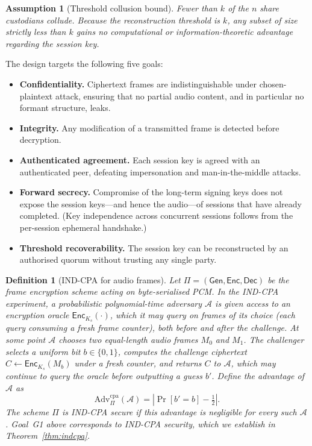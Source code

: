 \documentclass[pdflatex,sn-mathphys-num]{sn-jnl}%
\theoremstyle{thmstyleone}%
\newtheorem{assumption}{Assumption}%
\theoremstyle{thmstyletwo}%
\theoremstyle{thmstylethree}%
\newtheorem{definition}{Definition}%
\begin{document}
\begin{assumption}[Threshold collusion bound]
\label{as:escrow}
Fewer than $k$ of the $n$ share custodians collude. Because the reconstruction threshold is $k$, any subset of size strictly less than $k$ gains no computational or information-theoretic advantage regarding the session key.
\end{assumption}

The design targets the following five goals:

\begin{itemize}[leftmargin=2.2em]
\item[\textbf{G1}] \textbf{Confidentiality.} Ciphertext frames are indistinguishable under chosen-plaintext attack, ensuring that no partial audio content, and in particular no formant structure, leaks.
\item[\textbf{G2}] \textbf{Integrity.} Any modification of a transmitted frame is detected before decryption.
\item[\textbf{G3}] \textbf{Authenticated agreement.} Each session key is agreed with an authenticated peer, defeating impersonation and man-in-the-middle attacks.
\item[\textbf{G4}] \textbf{Forward secrecy.} Compromise of the long-term signing keys does not expose the session keys---and hence the audio---of sessions that have already completed. (Key independence across concurrent sessions follows from the per-session ephemeral handshake.)
\item[\textbf{G5}] \textbf{Threshold recoverability.} The session key can be reconstructed by an authorised quorum without trusting any single party.
\end{itemize}

\begin{definition}[IND-CPA for audio frames]
\label{def:indcpa}
Let $\Pi=(\mathsf{Gen},\mathsf{Enc},\mathsf{Dec})$ be the frame encryption scheme acting on byte-serialised PCM. In the IND-CPA experiment, a probabilistic polynomial-time adversary $\mathcal{A}$ is given access to an encryption oracle $\mathsf{Enc}_{K_s}(\cdot)$, which it may query on frames of its choice (each query consuming a fresh frame counter), both before and after the challenge. At some point $\mathcal{A}$ chooses two equal-length audio frames $M_0$ and $M_1$. The challenger selects a uniform bit $b \in \{0,1\}$, computes the challenge ciphertext $C \gets \mathsf{Enc}_{K_s}(M_b)$ under a fresh counter, and returns $C$ to $\mathcal{A}$, which may continue to query the oracle before outputting a guess $b'$. Define the advantage of $\mathcal{A}$ as
\[
\mathrm{Adv}^{\mathrm{cpa}}_{\Pi}(\mathcal{A}) = \left| \Pr[b' = b] - \tfrac{1}{2} \right|.
\]
The scheme $\Pi$ is IND-CPA secure if this advantage is negligible for every such $\mathcal{A}$. Goal~G1 above corresponds to IND-CPA security, which we establish in Theorem~\ref{thm:indcpa}.
\end{definition}
\end{document}
